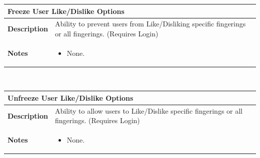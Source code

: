 \documentclass[12pt,english]{article}
\providecommand{\tabularnewline}{\\}
\providecommand{\tabularnewline}{\\}
\begin{document}
\begin{tabular}{|p{3cm}|p{13cm}|}
\hline 
\multicolumn{2}{|l|}{\textbf{Freeze User Like/Dislike Options}}\tabularnewline
\hline 
\textbf{Description}  & Ability to prevent users from Like/Disliking specific fingerings or
all fingerings. (Requires Login) \tabularnewline
\hline 
\textbf{Notes}  & \begin{itemize}
\item None. \end{itemize}
\tabularnewline
\hline 
\end{tabular}\\[0.5cm] %
\begin{tabular}{|p{3cm}|p{13cm}|}
\hline 
\multicolumn{2}{|l|}{\textbf{Unfreeze User Like/Dislike Options}}\tabularnewline
\hline 
\textbf{Description}  & Ability to allow users to Like/Dislike specific fingerings or all
fingerings. (Requires Login) \tabularnewline
\hline 
\textbf{Notes}  & \begin{itemize}
\item None. \end{itemize}
\tabularnewline
\hline 
\end{tabular}\\[0.5cm] 
\end{document}
